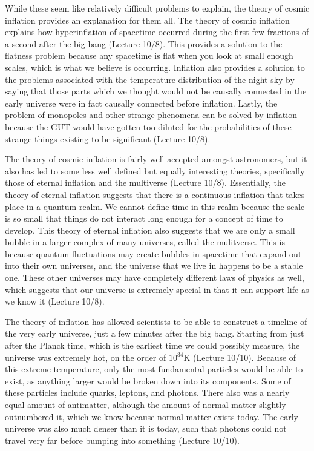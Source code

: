 \documentclass[12pt]{article}
\begin{document}
While these seem like relatively difficult problems to explain, the theory of
cosmic inflation provides an explanation for them all.  The theory of cosmic
inflation explains how hyperinflation of spacetime occurred during the first few
fractions of a second after the big bang (Lecture 10/8).  This provides a
solution to the
flatness problem because any spacetime is flat when you look at small enough
scales, which is what we believe is occurring.  Inflation also provides a
solution to the problems associated with the temperature distribution of the
night sky by saying that those parts which we thought would not be causally
connected in the early universe were in fact causally connected before
inflation.  Lastly, the problem of monopoles and other strange phenomena can be
solved by inflation because the GUT would have gotten too diluted for the
probabilities of these strange things existing to be significant (Lecture 10/8).


The theory of cosmic inflation is fairly well accepted amongst astronomers, but
it also has led to some less well defined but equally interesting theories,
specifically those of eternal inflation and the multiverse (Lecture 10/8).
Essentially, the
theory of eternal inflation suggests that there is a continuous inflation that
takes place in a quantum realm.  We cannot define time in this realm because the
scale is so small that things do not interact long enough for a concept of time
to develop.  This theory of eternal inflation also suggests that we are only a
small bubble in a larger complex of many universes, called the mulitverse.  This
is because quantum fluctuations may create bubbles in spacetime that expand out
into their own universes, and the universe that we live in happens to be a
stable one.  These other universes may have completely different laws of physics
as well, which suggests that our universe is extremely special in that it can
support life as we know it (Lecture 10/8).

The theory of inflation has allowed scientists to be able to construct a
timeline of the very early universe, just a few minutes after the big bang.
Starting from just after the Planck time, which is the earliest time we could
possibly measure, the universe was extremely hot, on the order of $10^{34}$K
(Lecture 10/10).
Because of this extreme temperature, only the most fundamental particles would
be able to exist, as anything larger would be broken down into its components.
Some of these particles include quarks, leptons, and photons. There also was a
nearly equal amount of antimatter, although the amount of normal matter slightly
outnumbered it, which we know because normal matter exists today.  The early
universe was also much denser than it is today, such that photons could not
travel very far before bumping into something (Lecture 10/10).
\end{document}
